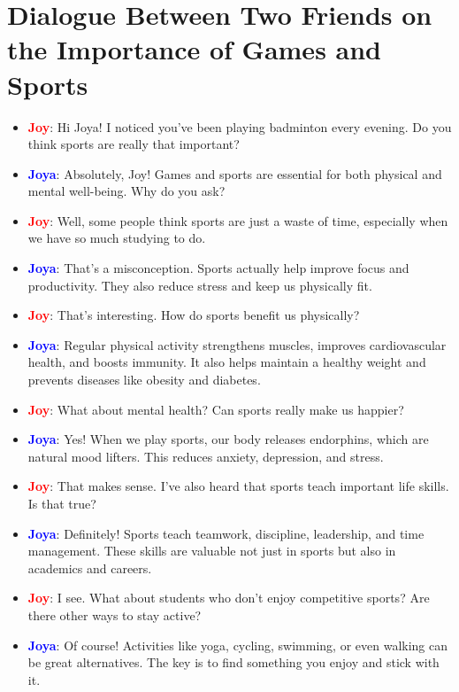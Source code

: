 \documentclass{article}
\begin{document}
\section*{Dialogue Between Two Friends on the Importance of Games and Sports}
\begin{itemize}
    \item \textbf{\textcolor{red}{Joy}}: Hi Joya! I noticed you’ve been playing badminton every evening. Do you think sports are really that important?
    \item \textbf{\textcolor{blue}{Joya}}: Absolutely, Joy! Games and sports are essential for both physical and mental well-being. Why do you ask?
    \item \textbf{\textcolor{red}{Joy}}: Well, some people think sports are just a waste of time, especially when we have so much studying to do.
    \item \textbf{\textcolor{blue}{Joya}}: That’s a misconception. Sports actually help improve focus and productivity. They also reduce stress and keep us physically fit.
    \item \textbf{\textcolor{red}{Joy}}: That’s interesting. How do sports benefit us physically?
    \item \textbf{\textcolor{blue}{Joya}}: Regular physical activity strengthens muscles, improves cardiovascular health, and boosts immunity. It also helps maintain a healthy weight and prevents diseases like obesity and diabetes.
    \item \textbf{\textcolor{red}{Joy}}: What about mental health? Can sports really make us happier?
    \item \textbf{\textcolor{blue}{Joya}}: Yes! When we play sports, our body releases endorphins, which are natural mood lifters. This reduces anxiety, depression, and stress.
    \item \textbf{\textcolor{red}{Joy}}: That makes sense. I’ve also heard that sports teach important life skills. Is that true?
    \item \textbf{\textcolor{blue}{Joya}}: Definitely! Sports teach teamwork, discipline, leadership, and time management. These skills are valuable not just in sports but also in academics and careers.
    \item \textbf{\textcolor{red}{Joy}}: I see. What about students who don’t enjoy competitive sports? Are there other ways to stay active?
    \item \textbf{\textcolor{blue}{Joya}}: Of course! Activities like yoga, cycling, swimming, or even walking can be great alternatives. The key is to find something you enjoy and stick with it.

\end{itemize}
\end{document}
